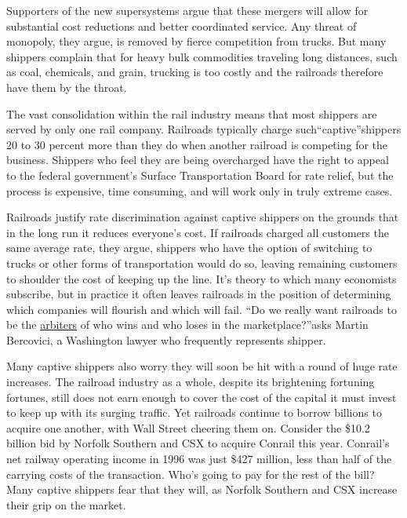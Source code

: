 Supporters of the new supersystems argue that these mergers will allow
for substantial cost reductions and better coordinated service. Any
threat of monopoly, they argue, is removed by fierce competition from
trucks. But many shippers complain that for heavy bulk commodities
traveling long distances, such as coal, chemicals, and grain, trucking
is too costly and the railroads therefore have them by the throat.

The vast consolidation within the rail industry means that most shippers
are served by only one rail company. Railroads typically charge
such``captive''shippers 20 to 30 percent more than they do when another
railroad is competing for the business. Shippers who feel they are being
overcharged have the right to appeal to the federal government's Surface
Transportation Board for rate relief, but the process is expensive, time
consuming, and will work only in truly extreme cases.

Railroads justify rate discrimination against captive shippers on the
grounds that in the long run it reduces everyone's cost. If railroads
charged all customers the same average rate, they argue, shippers who
have the option of switching to trucks or other forms of transportation
would do so, leaving remaining customers to shoulder the cost of keeping
up the line. It's theory to which many economists subscribe, but in
practice it often leaves railroads in the position of determining which
companies will flourish and which will fail. ``Do we really want
railroads to be the \uline{arbiters} of who wins and who loses in the
marketplace?''asks Martin Bercovici, a Washington lawyer who frequently
represents shipper.

Many captive shippers also worry they will soon be hit with a round of
huge rate increases. The railroad industry as a whole, despite its
brightening fortuning fortunes, still does not earn enough to cover the
cost of the capital it must invest to keep up with its surging traffic.
Yet railroads continue to borrow billions to acquire one another, with
Wall Street cheering them on. Consider the \$10.2 billion bid by Norfolk
Southern and CSX to acquire Conrail this year. Conrail's net railway
operating income in 1996 was just \$427 million, less than half of the
carrying costs of the transaction. Who's going to pay for the rest of
the bill? Many captive shippers fear that they will, as Norfolk Southern
and CSX increase their grip on the market.


